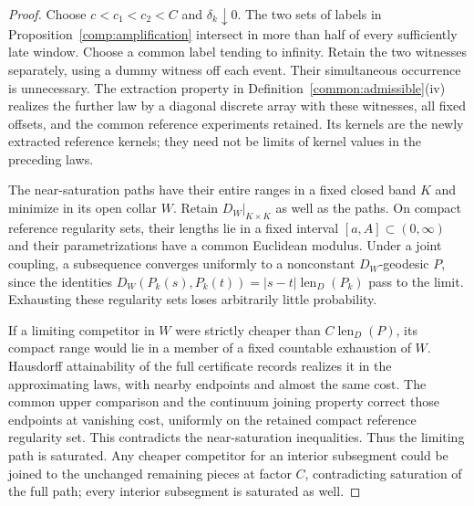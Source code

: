 \begin{proof}
Choose $c<c_1<c_2<C$ and $\delta_k\downarrow0$.  The two sets of labels
in Proposition~\ref{comp:amplification} intersect in more than half of
every sufficiently late window.  Choose a common label tending to
infinity.  Retain the two witnesses separately, using a dummy witness
off each event.  Their simultaneous occurrence is unnecessary.
The extraction property in Definition~\ref{common:admissible}(iv)
realizes the further law by a
diagonal discrete array with these witnesses, all fixed offsets, and
the common reference experiments retained.  Its kernels are the newly
extracted reference kernels; they need not be limits of kernel values
in the preceding laws.

The near-saturation paths have their entire ranges in a fixed closed
band $K$ and minimize in
its open collar $W$.  Retain $D_W|_{K\times K}$ as well as the paths.
On compact reference regularity sets, their lengths lie in a fixed
interval $[a,A]\subset(0,\infty)$ and their parametrizations have a
common Euclidean modulus.  Under a joint coupling, a subsequence
converges uniformly to a nonconstant $D_W$-geodesic $P$, since the
identities
$D_W(P_k(s),P_k(t))=|s-t|\operatorname{len}_D(P_k)$ pass to the
limit.  Exhausting these regularity sets loses arbitrarily little
probability.

If a limiting competitor in $W$ were strictly cheaper than
$C\operatorname{len}_D(P)$, its compact range would lie in a member
of a fixed countable exhaustion of $W$.  Hausdorff attainability of the
full certificate records realizes it in the approximating laws, with
nearby endpoints and almost the same cost.  The common upper comparison
and the continuum joining property correct those endpoints at vanishing
cost, uniformly on the retained compact reference regularity set.
This contradicts the near-saturation inequalities.  Thus the limiting
path is saturated.  Any cheaper competitor for an interior subsegment
could be joined to the unchanged remaining pieces at factor $C$,
contradicting saturation of the full path; every interior subsegment
is saturated as well.


\end{proof}
